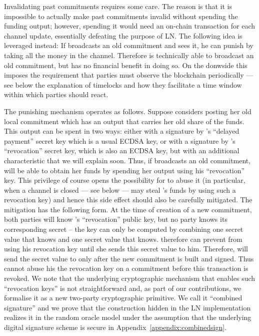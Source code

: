     Invalidating past commitments requires some care. The reason is that it is
    impossible to actually make past commitments invalid without spending the
    funding output; however, spending it would need an on-chain transaction for
    each channel update, essentially defeating the purpose of LN. The following
    idea is leveraged instead: If \alice{} broadcasts an old commitment and
    \bob{} sees it, he can punish \alice{} by taking all the money in the
    channel. Therefore \alice{} is technically able to broadcast an old
    commitment, but has no financial benefit in doing so. On the donwside this
    imposes the requirement that parties must observe the blockchain
    periodically --- see below the explanation of timelocks and how they
    facilitate a time window within which parties should react.

    The punishing mechanism operates as follows. Suppose \alice{} considers
    posting her old local commitment which has an output that carries her old
    share of the funds. This output can be spent in two ways: either with a
    signature by \alice's ``delayed payment'' secret key which is a usual ECDSA
    key, or with a signature by \bob's ``revocation'' secret key, which is also
    an ECDSA key, but with an additional characteristic that we will explain
    soon. Thus, if \alice{} broadcasts an old commitment, \bob{} will be able to
    obtain her funds by spending her output using his ``revocation'' key. This
    privilege of course opens the possibility for \bob{} to abuse it (in
    particular, when a channel is closed --- see below --- \bob{} may steal
    \alice's funds by using such a revocation key) and hence this side effect
    should also be carefully mitigated. The mitigation has the following form.
    At the time of creation of a new commitment, both parties will know \bob's
    ``revocation'' public key, but no party knows its corresponding secret --
    the key can only be computed by combining one secret value that \alice{}
    knows and one secret value that \bob{} knows. \alice{} therefore can prevent
    \bob{} from using his revocation key until she  sends this secret value to
    him. Therefore, \alice{} will send the secret value to \bob{} only after the
    new commitment is built and signed. Thus \bob{} cannot abuse his the
    revocation key on a commitment before this transaction is revoked. We note
    that the underlying cryptographic mechanism  that enables such ``revocation
    keys'' is not straightforward and, as part of our contributions, we
    formalise it as a new two-party cryptographic primitive. We call it
    ``combined signature'' and we prove that the construction hidden in the LN
    implementation realizes it in the random oracle model under the assumption
    that the underlying digital signature scheme is secure in
    Appendix~\ref{appendix:combinedsign}.

